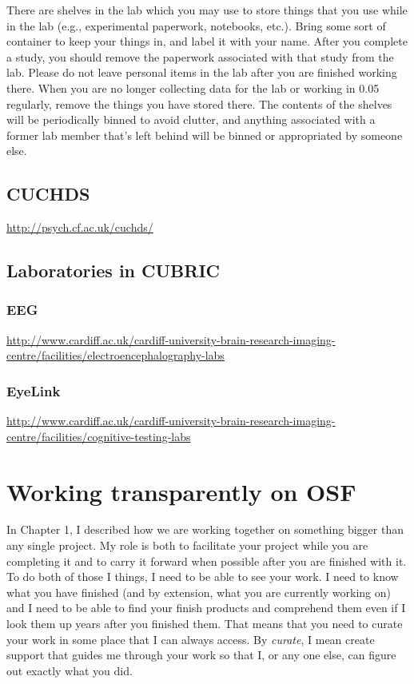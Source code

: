 \documentclass[12pt,]{book}
\theoremstyle{definition}
\theoremstyle{definition}
\theoremstyle{definition}
\theoremstyle{remark}
\begin{document}
There are shelves in the lab which you may use to store things that you
use while in the lab (e.g., experimental paperwork, notebooks, etc.).
Bring some sort of container to keep your things in, and label it with
your name. After you complete a study, you should remove the paperwork
associated with that study from the lab. Please do not leave personal
items in the lab after you are finished working there. When you are no
longer collecting data for the lab or working in 0.05 regularly, remove
the things you have stored there. The contents of the shelves will be
periodically binned to avoid clutter, and anything associated with a
former lab member that's left behind will be binned or appropriated by
someone else.

\section{CUCHDS}\label{cuchds}

\url{http://psych.cf.ac.uk/cuchds/}

\section{Laboratories in CUBRIC}\label{laboratories-in-cubric}

\subsection{EEG}\label{eeg}

\url{http://www.cardiff.ac.uk/cardiff-university-brain-research-imaging-centre/facilities/electroencephalography-labs}

\subsection{EyeLink}\label{eyelink}

\url{http://www.cardiff.ac.uk/cardiff-university-brain-research-imaging-centre/facilities/cognitive-testing-labs}

\chapter{Working transparently on
OSF}\label{working-transparently-on-osf}

In Chapter 1, I described how we are working together on something
bigger than any single project. My role is both to facilitate your
project while you are completing it and to carry it forward when
possible after you are finished with it. To do both of those I things, I
need to be able to see your work. I need to know what you have finished
(and by extension, what you are currently working on) and I need to be
able to find your finish products and comprehend them even if I look
them up years after you finished them. That means that you need to
curate your work in some place that I can always access. By
\emph{curate}, I mean create support that guides me through your work so
that I, or any one else, can figure out exactly what you did.
\end{document}
